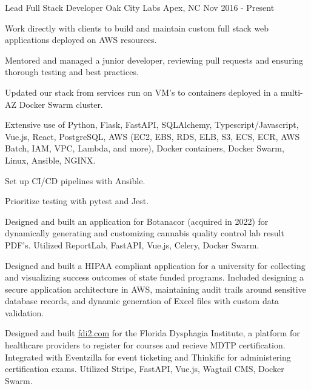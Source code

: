 

\begin{cventries}

  \cventry
    {Lead Full Stack Developer} %
    {Oak City Labs} %
    {Apex, NC} %
    {Nov 2016 - Present} %
    {
      \begin{cvitems} %
        \item {Work directly with clients to build and maintain custom full stack web applications deployed on AWS resources.}
        \item {Mentored and managed a junior developer, reviewing pull requests and ensuring thorough testing and best practices.}
        \item {Updated our stack from services run on VM's to containers deployed in a multi-AZ Docker Swarm cluster.}
        \item {Extensive use of Python, Flask, FastAPI, SQLAlchemy, Typescript/Javascript, Vue.js, React, PostgreSQL, AWS (EC2, EBS, RDS, ELB, S3, ECS, ECR, AWS Batch, IAM, VPC, Lambda, and more), Docker containers, Docker Swarm, Linux, Ansible, NGINX.}
        \item {Set up CI/CD pipelines with Ansible.}
        \item {Prioritize testing with pytest and Jest.}
        \item {Designed and built an application for Botanacor (acquired in 2022) for dynamically generating and customizing cannabis quality control lab result PDF's. Utilized ReportLab, FastAPI, Vue.js, Celery, Docker Swarm.}
        \item {Designed and built a HIPAA compliant application for a university for collecting and visualizing success outcomes of state funded programs. Included designing a secure application architecture in AWS, maintaining audit trails around sensitive database records, and dynamic generation of Excel files with custom data validation.}
        \item {Designed and built \href{https://fdi2.com}{fdi2.com} for the Florida Dysphagia Institute, a platform for healthcare providers to register for courses and recieve MDTP certification. Integrated with Eventzilla for event ticketing and Thinkific for administering certification exams. Utilized Stripe, FastAPI, Vue.js, Wagtail CMS, Docker Swarm.}

\end{cvitems}}
\end{cventries}

